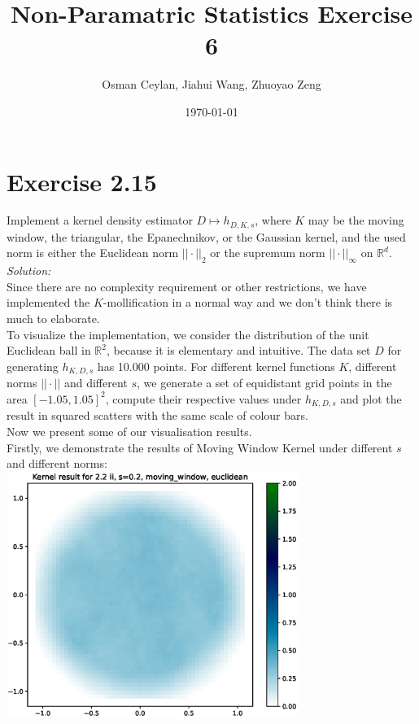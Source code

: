 \documentclass{article}
\title{Non-Paramatric Statistics Exercise 6}
\author{Osman Ceylan, Jiahui Wang, Zhuoyao Zeng}
\date{\today}
\begin{document}
\maketitle

\section*{Exercise 2.15} \vspace*{-1em}
Implement a kernel density estimator $D \mapsto h_{D,K,s}$, where $K$ may be the moving window, the triangular, the Epanechnikov, or the Gaussian kernel, and the used norm is either the Euclidean norm $||\cdot ||_2$ or the supremum norm $||\cdot ||_{\infty}$ on $\mathbb{R}^d$.\vspace*{1em} \\
\textit{Solution:} \\
Since there are no complexity requirement or other restrictions, we have  implemented the  $K$-mollification in a normal way and we don't think there is much to elaborate. \\
To visualize the implementation, we consider the distribution of the unit Euclidean ball in $\mathbb{R}^2$, because it is elementary and intuitive. The data set $D$ for generating $h_{K,D,s}$ has  10.000 points. For different kernel functions $K$, different norms $||\cdot ||$ and different $s$, we generate a set of equidistant grid points in the area $[-1.05 , 1.05]^2$, compute their respective values under $h_{K,D,s}$ and plot the result in squared scatters with the same scale of colour bars. \vspace*{1em}\\
Now we present some of our visualisation results. \\
Firstly, we demonstrate the results of Moving Window Kernel under different $s$ and different norms: \\
\hspace*{-1.5cm}\includegraphics[height=8cm]{comparisons//Kernel_result_2-2ii_s_0-2_moving_window_euclidean.eps} \hspace*{-1.5cm}
\end{document}
